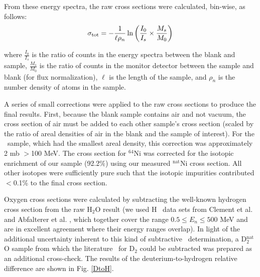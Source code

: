 From these energy spectra, the raw cross sections were calculated, bin-wise, as follows:
\begin{equation} \label{CSCalculation}
    \sigma_{\text{tot}} = -\frac{1}{\ell\rho_{n}}
    \ln \left(\frac{I_{0}}{I_{s}}\times\frac{M_{s}}{M_{0}}\right)
\end{equation}

\noindent
where $\frac{I_{0}}{I_{s}}$ is the ratio of counts in the energy spectra between 
the blank and sample, $\frac{M_{s}}{M_{0}}$ is the ratio of counts in the
monitor detector between the sample and blank (for flux normalization), $\ell$ is the length 
of the sample, and $\rho_{n}$ is the number density of atoms in the sample.

A series of small corrections were applied to the raw cross sections to produce
the final results. First, because the blank sample contains air and not vacuum,
the cross section of air must be added to each other sample's cross section (scaled by  
the ratio of areal densities of air in the blank and the sample of interest).
For the \rhThree\ sample, which had the smallest areal density, this correction
was approximately 2 mb $>$100 MeV. The cross section for $^{64}$Ni was corrected for the 
isotopic enrichment of our
sample (92.2\%) using our measured $^{\text{nat}}$Ni cross section. All other isotopes were 
sufficiently pure such that the isotopic impurities contributed $<$0.1\% to the final
cross section.

Oxygen cross sections were calculated by
subtracting the well-known hydrogen cross section from the raw H$_{2}$O result
(we used H \tot\ data sets from Clement et al. \cite{Clement1972} and Abfalterer
et al. \cite{Abfalterer2001}, which together cover the range $0.5 \leq E_n \leq 500$ MeV
and are in excellent agreement where their energy ranges overlap). In light of
the additional uncertainty inherent to this kind of subtractive \tot\
determination, a D$_{2}^{\text{nat}}$O sample from which the literature \tot\ for
D$_{2}$ could be subtracted was prepared as an additional cross-check. The
results of the deuterium-to-hydrogen relative difference are shown in Fig. \ref{DtoH}. 

